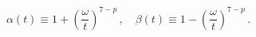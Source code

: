 \begin{equation}\label{alphabeta}
\alpha(t)\equiv 1+\left({\frac{\omega}{t}} \right)^{7-p}\,,\quad
\beta(t)\equiv 1-\left({\frac{\omega}{t}} \right)^{7-p}\,.
\end{equation}

